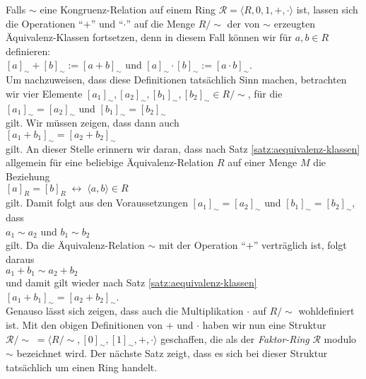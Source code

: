 Falls $\sim$ eine Kongruenz-Relation auf einem Ring $\mathcal{R} = \langle R, 0, 1, +, \cdot \rangle$ ist,
lassen sich die Operationen ``$+$'' und ``$\cdot$'' auf die Menge $R/\!\sim$ der von $\sim$ erzeugten
\"{A}quivalenz-Klassen fortsetzen, denn in diesem Fall k\"{o}nnen wir f\"{u}r $a,b \in R$ definieren:
\\[0.2cm]
\hspace*{1.3cm}
$[a]_\sim + [b]_\sim := [ a + b ]_\sim$ \quad und \quad
$[a]_\sim \cdot [b]_\sim := [ a \cdot b ]_\sim$.
\\[0.2cm]
Um nachzuweisen, dass diese Definitionen tats\"{a}chlich Sinn machen, betrachten wir vier
 Elemente $[a_1]_\sim, [a_2]_\sim, [b_1]_\sim, [b_2]_\sim \in R/\!\sim$, f\"{u}r die
\\[0.2cm]
\hspace*{1.3cm}
$[a_1]_\sim = [a_2]_\sim$ \quad und \quad
$[b_1]_\sim = [b_2]_\sim$ 
\\[0.2cm]
gilt.  Wir m\"{u}ssen zeigen, dass dann auch 
\\[0.2cm]
\hspace*{1.3cm}
$[a_1 + b_1]_\sim = [a_2 + b_2]_\sim$
\\[0.2cm]
gilt.  An dieser Stelle erinnern wir daran, dass nach Satz \ref{satz:aequivalenz-klassen}
allgemein f\"{u}r eine beliebige \"{A}quivalenz-Relation $R$ auf einer Menge $M$ die Beziehung
\\[0.2cm]
\hspace*{1.3cm}
$[a]_R = [b]_R \;\leftrightarrow\; \langle a, b \rangle \in R$
\\[0.2cm]
gilt.  Damit folgt aus den Voraussetzungen $[a_1]_\sim = [a_2]_\sim$ und $[b_1]_\sim = [b_2]_\sim$, dass
\\[0.2cm]
\hspace*{1.3cm}
$a_1 \sim a_2$ \quad und \quad $b_1 \sim b_2$
\\[0.2cm]
gilt.
Da die \"{A}quivalenz-Relation $\sim$ mit der Operation ``$+$'' vertr\"{a}glich ist, folgt daraus
\\[0.2cm]
\hspace*{1.3cm}
$a_1 + b_1 \sim  a_2 + b_2$ 
\\[0.2cm]
und damit gilt wieder nach Satz \ref{satz:aequivalenz-klassen} 
\\[0.2cm]
\hspace*{1.3cm}
$[a_1 + b_1]_\sim = [a_2 + b_2]_\sim$. 
\\[0.2cm]
Genauso l\"{a}sst sich zeigen, dass auch die Multiplikation $\cdot$ auf $R/\!\sim$ wohldefiniert ist.
Mit den obigen  Definitionen von $+$ und $\cdot$ haben wir nun eine Struktur 
$\mathcal{R}/\!\sim\; = \langle R/\!\sim, [0]_\sim, [1]_\sim, +, \cdot \rangle$ geschaffen, die als der
{\color{blue}\emph{Faktor-Ring}} $\mathcal{R}$ modulo $\sim$ bezeichnet wird. 
Der n\"{a}chste Satz zeigt, dass es sich bei dieser Struktur tats\"{a}chlich um einen Ring handelt.

